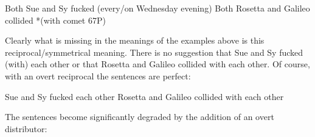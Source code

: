 \documentclass[output=paper]{langsci/langscibook}
\begin{document}
\ea\label{ex:key:29.19}
    \ea Both Sue and Sy fucked (every/on Wednesday evening)
    \ex Both Rosetta and Galileo collided *(with comet 67P)
    \z
\z

Clearly what is missing in the meanings of the examples above is this
reciprocal/symmetrical meaning. There is no suggestion that Sue and Sy fucked
(with) each other or that Rosetta and Galileo collided with each other. Of
course, with an overt reciprocal the sentences are perfect:

\ea\label{ex:key:29.20}
    \ea Sue and Sy fucked each other
    \ex Rosetta and Galileo collided with each other
    \z
\z

The sentences become significantly degraded by the addition of an overt distributor:

\ea\label{ex:key:29.21}
    \z
\z
\end{document}
